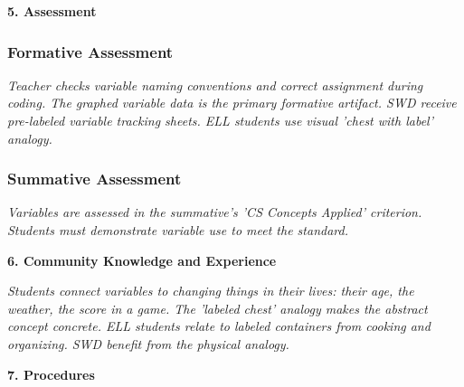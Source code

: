 \documentclass[11pt,letterpaper]{article}
\begin{document}
\newpage
\textbf{5. Assessment}

\subsubsection{Formative Assessment}

\textit{Teacher checks variable naming conventions and correct assignment during coding. The graphed variable data is the primary formative artifact. SWD receive pre-labeled variable tracking sheets. ELL students use visual 'chest with label' analogy.}

\subsubsection{Summative Assessment}

\textit{Variables are assessed in the summative's 'CS Concepts Applied' criterion. Students must demonstrate variable use to meet the standard.}

\textbf{6. Community Knowledge and Experience}

\textit{Students connect variables to changing things in their lives: their age, the weather, the score in a game. The 'labeled chest' analogy makes the abstract concept concrete. ELL students relate to labeled containers from cooking and organizing. SWD benefit from the physical analogy.}

\textbf{7. Procedures}
\end{document}

